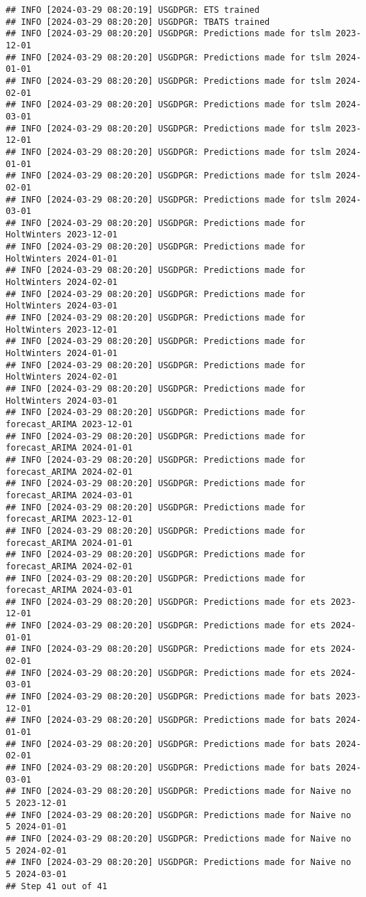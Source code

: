 \documentclass[
]{article}
\begin{document}
\begin{verbatim}
## INFO [2024-03-29 08:20:19] USGDPGR: ETS trained
## INFO [2024-03-29 08:20:20] USGDPGR: TBATS trained
## INFO [2024-03-29 08:20:20] USGDPGR: Predictions made for tslm 2023-12-01
## INFO [2024-03-29 08:20:20] USGDPGR: Predictions made for tslm 2024-01-01
## INFO [2024-03-29 08:20:20] USGDPGR: Predictions made for tslm 2024-02-01
## INFO [2024-03-29 08:20:20] USGDPGR: Predictions made for tslm 2024-03-01
## INFO [2024-03-29 08:20:20] USGDPGR: Predictions made for tslm 2023-12-01
## INFO [2024-03-29 08:20:20] USGDPGR: Predictions made for tslm 2024-01-01
## INFO [2024-03-29 08:20:20] USGDPGR: Predictions made for tslm 2024-02-01
## INFO [2024-03-29 08:20:20] USGDPGR: Predictions made for tslm 2024-03-01
## INFO [2024-03-29 08:20:20] USGDPGR: Predictions made for HoltWinters 2023-12-01
## INFO [2024-03-29 08:20:20] USGDPGR: Predictions made for HoltWinters 2024-01-01
## INFO [2024-03-29 08:20:20] USGDPGR: Predictions made for HoltWinters 2024-02-01
## INFO [2024-03-29 08:20:20] USGDPGR: Predictions made for HoltWinters 2024-03-01
## INFO [2024-03-29 08:20:20] USGDPGR: Predictions made for HoltWinters 2023-12-01
## INFO [2024-03-29 08:20:20] USGDPGR: Predictions made for HoltWinters 2024-01-01
## INFO [2024-03-29 08:20:20] USGDPGR: Predictions made for HoltWinters 2024-02-01
## INFO [2024-03-29 08:20:20] USGDPGR: Predictions made for HoltWinters 2024-03-01
## INFO [2024-03-29 08:20:20] USGDPGR: Predictions made for forecast_ARIMA 2023-12-01
## INFO [2024-03-29 08:20:20] USGDPGR: Predictions made for forecast_ARIMA 2024-01-01
## INFO [2024-03-29 08:20:20] USGDPGR: Predictions made for forecast_ARIMA 2024-02-01
## INFO [2024-03-29 08:20:20] USGDPGR: Predictions made for forecast_ARIMA 2024-03-01
## INFO [2024-03-29 08:20:20] USGDPGR: Predictions made for forecast_ARIMA 2023-12-01
## INFO [2024-03-29 08:20:20] USGDPGR: Predictions made for forecast_ARIMA 2024-01-01
## INFO [2024-03-29 08:20:20] USGDPGR: Predictions made for forecast_ARIMA 2024-02-01
## INFO [2024-03-29 08:20:20] USGDPGR: Predictions made for forecast_ARIMA 2024-03-01
## INFO [2024-03-29 08:20:20] USGDPGR: Predictions made for ets 2023-12-01
## INFO [2024-03-29 08:20:20] USGDPGR: Predictions made for ets 2024-01-01
## INFO [2024-03-29 08:20:20] USGDPGR: Predictions made for ets 2024-02-01
## INFO [2024-03-29 08:20:20] USGDPGR: Predictions made for ets 2024-03-01
## INFO [2024-03-29 08:20:20] USGDPGR: Predictions made for bats 2023-12-01
## INFO [2024-03-29 08:20:20] USGDPGR: Predictions made for bats 2024-01-01
## INFO [2024-03-29 08:20:20] USGDPGR: Predictions made for bats 2024-02-01
## INFO [2024-03-29 08:20:20] USGDPGR: Predictions made for bats 2024-03-01
## INFO [2024-03-29 08:20:20] USGDPGR: Predictions made for Naive no  5 2023-12-01
## INFO [2024-03-29 08:20:20] USGDPGR: Predictions made for Naive no  5 2024-01-01
## INFO [2024-03-29 08:20:20] USGDPGR: Predictions made for Naive no  5 2024-02-01
## INFO [2024-03-29 08:20:20] USGDPGR: Predictions made for Naive no  5 2024-03-01
## Step 41 out of 41
\end{verbatim}
\end{document}
